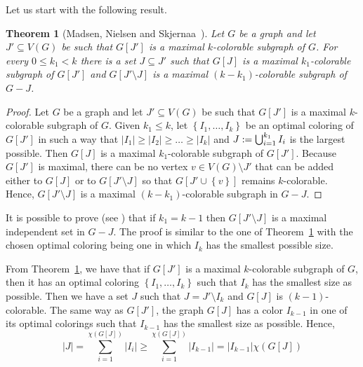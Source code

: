 \documentclass[fleqn,10pt]{SelfArx} %
\newtheorem{teor}{Theorem}
\newcommand{\chaves}[1] {\ensuremath{{\left \{ {#1} \right \}}}}
\newcommand{\pordef}{\ensuremath{\mathrel{:\mkern-0.25mu=}}}
\begin{document}
	Let us start with the following result.
	
	\begin{teor}[Madsen, Nielsen and Skjernaa~\cite{MadsenNielsenSkjernaa02}]\label{teo:mns} 
		Let $G$ be a graph and let $J' \subseteq V(G)$ be such that $G[J']$ is a
		maximal $k$-colorable subgraph of $G$. For every $0 \leq k_1 < k$ there
		is a set $J \subseteq J'$ such that $G[J]$ is a maximal
		$k_1$-colorable subgraph of $G[J']$ and $G[J' \setminus J]$ is a maximal
		$(k-k_1)$-colorable subgraph of $G-J$.
	\end{teor}
	\begin{proof}   

		Let $G$ be a graph and let
		$J' \subseteq V(G)$ be such that $G[J']$ is a maximal
		$k$-colorable subgraph of $G$. Given $k_{1} \leq k$, let
		$\chaves{I_{1}, \ldots, I_{k}}$ be an optimal coloring of $G[J']$ in such a
		way that $|I_{1}| \geq |I_{2}| \geq \ldots \geq |I_{k}|$ and 
		$J \pordef \bigcup_{i=1}^{k_{1}} I_i$ is the largest
		possible.  Then $G[J]$ is a maximal $k_1$-colorable subgraph of
		$G[J']$.
		Because $G[J']$ is maximal, there can be no vertex
		$v \in V(G) \setminus J'$ that can be added either to $G[J]$ or to
		$G[J' \setminus J]$ so that $G[J' \cup \chaves{v}]$ remains
		$k$-colorable.
		Hence, $G[J' \setminus J]$ is a maximal $(k-k_1)$-colorable subgraph in
		$G-J$.

	\end{proof}
	
	It is possible to prove (see \cite[sec. 3.2.2]{Lima17}) that if $k_1 = k-1$ then $G[J' \setminus J]$ is a maximal independent set in $G-J$. The proof is
	similar to the one of Theorem~\ref{teo:mns} with the chosen optimal
	coloring being one in which $I_k$ has the smallest possible size.
	
	From Theorem~\ref{teo:mns}, we have that if $G[J']$ is a maximal
	$k$-colorable subgraph of $G$, then it has an optimal coloring $\chaves{I_{1}, \ldots, I_{k}}$ such that $I_k$ has the smallest
	size as possible. Then we have a set $J$ such that
	$J = J' \setminus I_k$ and $G[J]$ is $(k-1)$-colorable. The same way as
	$G[J']$, the graph $G[J]$ has a color $I_{k-1}$ in one of its
	optimal colorings such that $I_{k-1}$ has the smallest size as
	possible. Hence,
	\begin{equation*}
	|J| 
	=
	\sum_{i=1}^{\chi(G[J])} |I_i| 
	\geq 
	\sum_{i=1}^{\chi(G[J])} |I_{k-1}| 
	=
	|I_{k-1}|\chi(G[J])
	\end{equation*}
	
\end{document}
